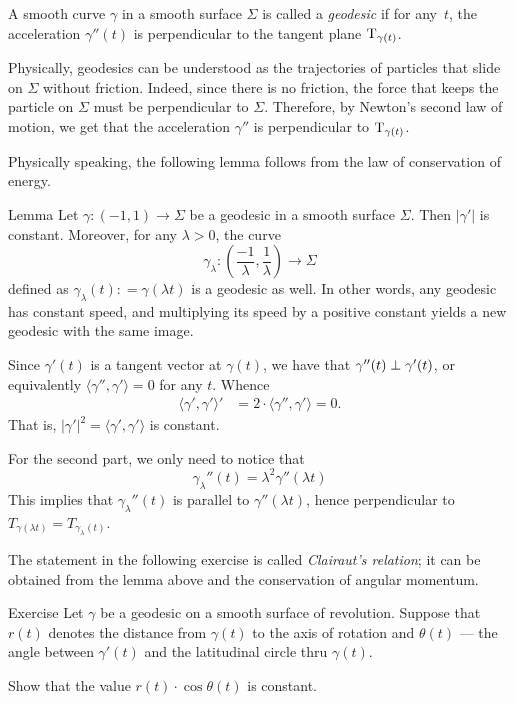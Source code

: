 A smooth curve $\gamma$ in a smooth surface $\Sigma$ is called a \emph{geodesic} if for any~$t$, the acceleration $\gamma''(t)$ is perpendicular to the tangent plane $\mathrm{T}_{\gamma(t)}$.

Physically, geodesics can be understood as the trajectories of  particles that slide on $\Sigma$ without friction.
Indeed, since there is no friction, the force that keeps the particle on $\Sigma$ must be perpendicular to $\Sigma$.
Therefore, by  Newton's second law of motion,
we get that the acceleration $\gamma''$ is perpendicular to $\mathrm{T}_{\gamma(t)}$.

Physically speaking, the following lemma follows from the law of conservation of energy.


\begin{thm}{Lemma}\label{lem:constant-speed}
Let $\gamma: (-1,1) \to \Sigma $ be a geodesic in a smooth surface $\Sigma$. 
Then  $| \gamma ' |$ is constant.
Moreover, for any $\lambda >0$, the curve 
\[ \gamma_{\lambda}: (\frac{-1}{\lambda} , \frac{1}{\lambda} ) \to \Sigma   \]
 defined as $\gamma _{\lambda }(t) : = \gamma (\lambda t)$ is a geodesic as well. 
 In other words, any geodesic has constant speed, and multiplying its speed by a positive constant yields a new geodesic with the same image.
\end{thm}


Since $\gamma'(t)$ is a tangent vector at $\gamma(t)$,
we have that $\gamma''(t)\z\perp\gamma'(t)$, or equivalently $\langle\gamma'',\gamma'\rangle=0$ for any $t$.
Whence 
\begin{align*}
\langle\gamma',\gamma'\rangle'&=2\cdot \langle\gamma'',\gamma'\rangle=0.
\end{align*}
That is, $|\gamma'|^2=\langle\gamma',\gamma'\rangle$ is constant.

For the second part, we only need to notice that 
\[  \gamma_{\lambda}''(t) =  \lambda^2 \gamma''(\lambda t)   \]
This implies that $\gamma_{\lambda}''(t)$ is parallel to $\gamma''(\lambda t)$, hence perpendicular to $T_{\gamma (\lambda t)}=T_{\gamma_{\lambda}(t)}$.
\qeds


The statement in the following exercise is called \emph{Clairaut's relation};
it can be obtained from the lemma above and the conservation of angular momentum.

\begin{thm}{Exercise}\label{ex:clairaut}
Let $\gamma$ be a geodesic on a smooth surface of revolution.
Suppose that $r(t)$ denotes the distance from $\gamma(t)$ to the axis of rotation
and $\theta(t)$ --- the angle between $\gamma'(t)$ and the latitudinal circle thru $\gamma(t)$. 

Show that the value $r(t)\cdot \cos\theta(t)$ is constant. 
\end{thm}


